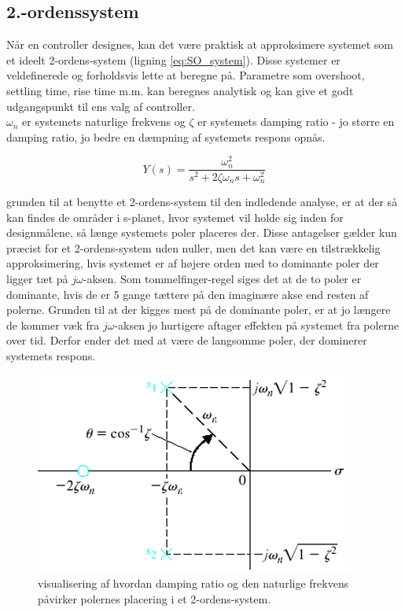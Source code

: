 \subsection{2.-ordenssystem}

Når en controller designes, kan det være praktisk at approksimere systemet som et ideelt 2-ordens-system (ligning \eqref{eq:SO_system}). Disse systemer er veldefinerede og forholdsvis lette at beregne på. Parametre som overshoot, settling time, rise time m.m. kan beregnes analytisk og kan give et godt udgangspunkt til ens valg af controller.\\ $\omega_{n}$ er systemets naturlige frekvens og $\zeta$ er systemets damping ratio - jo større en damping ratio, jo bedre en dæmpning af systemets respons opnås.

\begin{equation}\label{eq:SO_system}
Y(s)=\frac{\omega_{n}^2}{s^2+2\zeta\omega_{n}s+\omega_{n}^2}
\end{equation}

grunden til at benytte et 2-ordens-system til den indledende analyse, er at der så kan findes de områder i s-planet, hvor systemet vil holde sig inden for designmålene, så længe systemets poler placeres der. Disse antagelser gælder kun præcist for et 2-ordens-system uden nuller, men det kan være en tilstrækkelig approksimering, hvis systemet er af højere orden med to dominante poler der ligger tæt på $j\omega$-aksen. Som tommelfinger-regel siges det at de to poler er dominante, hvis de er 5 gange tættere på den imaginære akse end resten af polerne. Grunden til at der kigges mest på de dominante poler, er at jo længere de kommer væk fra $j\omega$-aksen jo hurtigere aftager effekten på systemet fra polerne over tid. Derfor ender det med at være de langsomme poler, der dominerer systemets respons.

\begin{figure}[!ht]
	\centering
	\includegraphics[scale=0.5]{Billeder/Damping_Ratio.PNG}
	\caption{visualisering af hvordan damping ratio og den naturlige frekvens påvirker polernes placering i et 2-ordens-system.}
	\label{fig:SO_system}
\end{figure}

